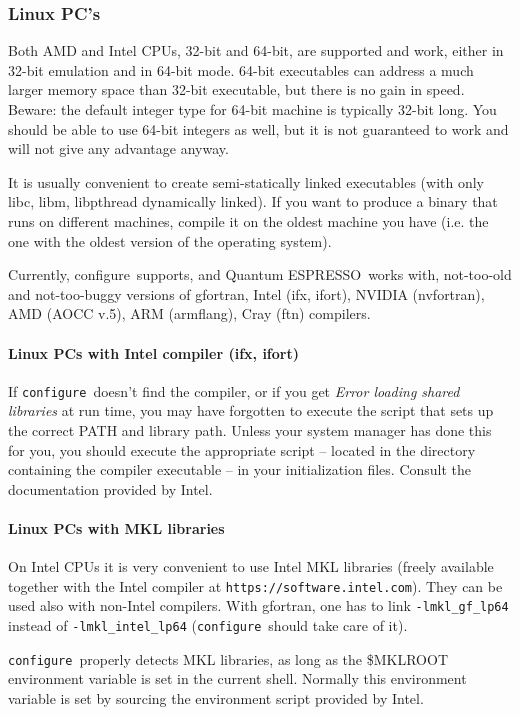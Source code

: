 \documentclass[12pt,a4paper]{article}
\def\qe{{\sc Quantum ESPRESSO}}
\def\configure{\texttt{configure}}
\begin{document}
\subsubsection{Linux PC's}

Both AMD and Intel CPUs, 32-bit and 64-bit, are supported and work,
either in 32-bit emulation and in 64-bit mode. 64-bit executables
can address a much larger memory space than 32-bit executable, but
there is no gain in speed.
Beware: the default integer type for 64-bit machine is typically
32-bit long. You should be able to use 64-bit integers as well,
but it is not guaranteed to work and will not give
any advantage anyway.

It is usually convenient to create semi-statically linked executables (with only
libc, libm, libpthread dynamically linked). If you want to produce a binary
that runs on different machines, compile it on the oldest machine you have
(i.e. the one with the oldest version of the operating system).

Currently, configure\ supports, and \qe\ works with, not-too-old and
not-too-buggy versions of gfortran, Intel (ifx, ifort), NVIDIA (nvfortran),
AMD (AOCC v.5), ARM (armflang), Cray (ftn) compilers.

\paragraph{Linux PCs with Intel compiler (ifx, ifort)}
If \configure\ doesn't find the compiler, or if you get
{\em Error loading shared libraries} at run time, you may have
forgotten to execute the script that
sets up the correct PATH and library path. Unless your system manager has
done this for you, you should execute the appropriate script -- located in
the directory containing the compiler executable -- in your
initialization files. Consult the documentation provided by Intel.

\paragraph{Linux PCs with MKL libraries}
On Intel CPUs it is very convenient to use Intel MKL libraries
(freely available together with the Intel compiler at
\texttt{https://software.intel.com}). They can be used also 
with non-Intel compilers. With gfortran, one has to link 
\texttt{-lmkl\_gf\_lp64} instead of \texttt{-lmkl\_intel\_lp64} 
(\configure\ should take care of it).

\configure\ properly detects MKL libraries,
as long as the \$MKLROOT environment variable is set in the current shell.
Normally this environment variable is set by sourcing the environment script
provided by Intel.
\end{document}
